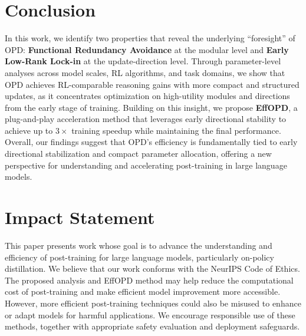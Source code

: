 \documentclass{llmxive}
\begin{document}
\section{Conclusion}
In this work, we identify two properties that reveal the underlying ``foresight'' of OPD: \textbf{Functional Redundancy Avoidance} at the modular level and \textbf{Early Low-Rank Lock-in} at the update-direction level. Through parameter-level analyses across model scales, RL algorithms, and task domains, we show that OPD achieves RL-comparable reasoning gains with more compact and structured updates, as it concentrates optimization on high-utility modules and directions from the early stage of training. Building on this insight, we propose \textbf{EffOPD}, a plug-and-play acceleration method that leverages early directional stability to achieve up to \(3\times\) training speedup while maintaining the final performance. Overall, our findings suggest that OPD's efficiency is fundamentally tied to early directional stabilization and compact parameter allocation, offering a new perspective for understanding and accelerating post-training in large language models.






\appendix



\section{Impact Statement}
This paper presents work whose goal is to advance the understanding and efficiency of post-training for large language models, particularly on-policy distillation. We believe that our work conforms with the NeurIPS Code of Ethics. The proposed analysis and EffOPD method may help reduce the computational cost of post-training and make efficient model improvement more accessible. However, more efficient post-training techniques could also be misused to enhance or adapt models for harmful applications. We encourage responsible use of these methods, together with appropriate safety evaluation and deployment safeguards.
\end{document}
